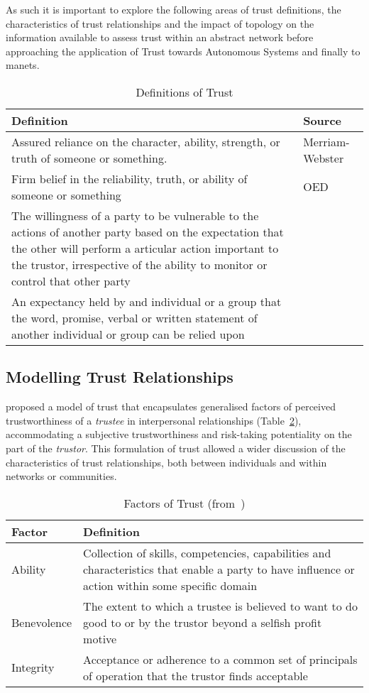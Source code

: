 As such it is important to explore the following areas of trust definitions, the characteristics of trust relationships and the impact of topology on the information available to assess trust within an abstract network before approaching the application of Trust towards Autonomous Systems and finally to \glspl{manet}.
%
\begin{table}[h]
  \centering
  \caption{Definitions of Trust}
  \label{tab:trust_definitions}
  \begin{tabularx}{\textwidth}{X p{3cm}}\toprule
    Definition & Source \\ \midrule
    Assured reliance on the character, ability, strength, or truth of someone or something.
    & Merriam-Webster\\
    Firm belief in the reliability, truth, or ability of someone or something & OED\\
    The willingness of a party to be vulnerable to the actions of another party based on the expectation that the other will perform a articular action important to the trustor, irrespective of the ability to monitor or control that other party &~\citet{Mayer1995} \\
    An expectancy held by and individual or a group that the word, promise, verbal or written statement of another individual or group can be relied upon &~\citet{Rotter1967}\\\bottomrule
  \end{tabularx}
\end{table}
%

\subsection{Modelling Trust Relationships}
\citet{Mayer1995} proposed a model of trust that encapsulates generalised factors of perceived trustworthiness of a \textit{trustee} in interpersonal relationships (Table~\ref{tab:trust_factors}), accommodating a subjective trustworthiness and risk-taking potentiality on the part of the \textit{trustor}.
This formulation of trust allowed a wider discussion of the characteristics of trust relationships, both between individuals and within networks or communities.

\begin{table}[h]
  \centering
  \caption[Factors of Trust]{Factors of Trust (from~\citet{Mayer1995})}
  \label{tab:trust_factors}
  \begin{tabularx}{\textwidth}{p{2cm}X}\toprule
    Factor & Definition \\ \midrule
    Ability & Collection of skills, competencies, capabilities and characteristics that enable a party to have influence or action within some specific domain \\
    Benevolence & The extent to which a trustee is believed to want to do good to or by the trustor beyond a selfish profit motive\\
    Integrity & Acceptance or adherence to a common set of principals of operation that the trustor finds acceptable\\
    \bottomrule
  \end{tabularx}
\end{table}

